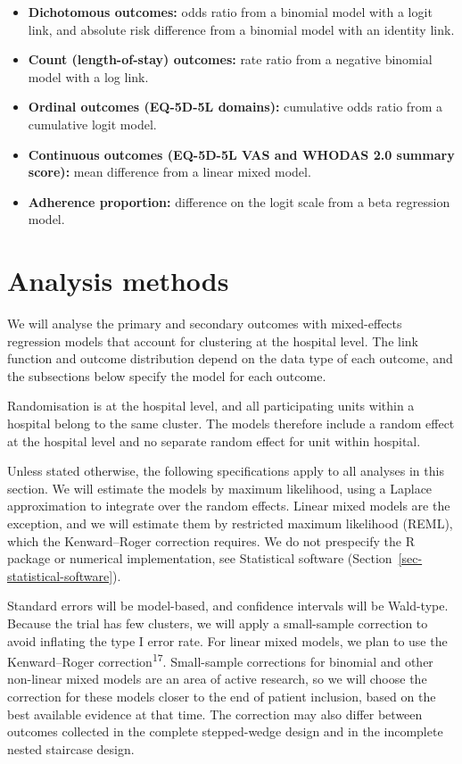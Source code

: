 \documentclass[
]{scrartcl}
\providecommand{\tightlist}{%
  \setlength{\itemsep}{0pt}\setlength{\parskip}{0pt}}\usepackage{longtable,booktabs,array}
\begin{document}
\begin{itemize}
\tightlist
\item
  \textbf{Dichotomous outcomes:} odds ratio from a binomial model with a
  logit link, and absolute risk difference from a binomial model with an
  identity link.
\item
  \textbf{Count (length-of-stay) outcomes:} rate ratio from a negative
  binomial model with a log link.
\item
  \textbf{Ordinal outcomes (EQ-5D-5L domains):} cumulative odds ratio
  from a cumulative logit model.
\item
  \textbf{Continuous outcomes (EQ-5D-5L VAS and WHODAS 2.0 summary
  score):} mean difference from a linear mixed model.
\item
  \textbf{Adherence proportion:} difference on the logit scale from a
  beta regression model.
\end{itemize}

\section{Analysis methods}\label{sec-analysis-methods}

We will analyse the primary and secondary outcomes with mixed-effects
regression models that account for clustering at the hospital level. The
link function and outcome distribution depend on the data type of each
outcome, and the subsections below specify the model for each outcome.

Randomisation is at the hospital level, and all participating units
within a hospital belong to the same cluster. The models therefore
include a random effect at the hospital level and no separate random
effect for unit within hospital.

Unless stated otherwise, the following specifications apply to all
analyses in this section. We will estimate the models by maximum
likelihood, using a Laplace approximation to integrate over the random
effects. Linear mixed models are the exception, and we will estimate
them by restricted maximum likelihood (REML), which the Kenward--Roger
correction requires. We do not prespecify the R package or numerical
implementation, see Statistical software
(Section~\ref{sec-statistical-software}).

Standard errors will be model-based, and confidence intervals will be
Wald-type. Because the trial has few clusters, we will apply a
small-sample correction to avoid inflating the type I error rate. For
linear mixed models, we plan to use the Kenward--Roger
correction\textsuperscript{17}. Small-sample corrections for binomial
and other non-linear mixed models are an area of active research, so we
will choose the correction for these models closer to the end of patient
inclusion, based on the best available evidence at that time. The
correction may also differ between outcomes collected in the complete
stepped-wedge design and in the incomplete nested staircase design.
\end{document}
